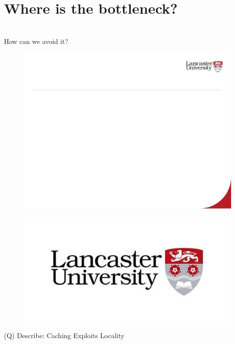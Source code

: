 \documentclass[12pt]{article}
\begin{document}
\section{Where is the bottleneck?}
\\
How can we avoid it?\\
\begin{figure}[H]
\includegraphics[width=0.5\linewidth]{page82-image-1.png}
\end{figure}
\begin{figure}[H]
\includegraphics[width=0.5\linewidth]{page82-image-2.png}
\end{figure}
\clearpage
(Q)
Describe: Caching Exploits Locality
\clearpage
\end{document}
